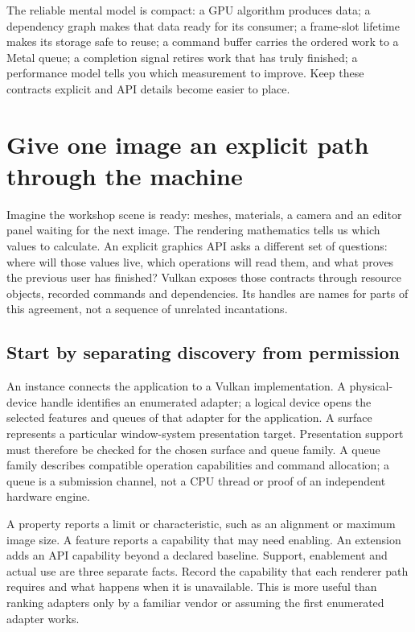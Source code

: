The reliable mental model is compact: a GPU algorithm produces data; a dependency graph makes that data ready for its consumer; a frame-slot lifetime makes its storage safe to reuse; a command buffer carries the ordered work to a Metal queue; a completion signal retires work that has truly finished; a performance model tells you which measurement to improve. Keep these contracts explicit and API details become easier to place.

\section{Give one image an explicit path through the machine}\label{01-foundations-i-ch011-give-one-image-an-explicit-path-through-the-machine}

Imagine the workshop scene is ready: meshes, materials, a camera and an editor panel waiting for the next image. The rendering mathematics tells us which values to calculate. An explicit graphics API asks a different set of questions: where will those values live, which operations will read them, and what proves the previous user has finished? Vulkan exposes those contracts through resource objects, recorded commands and dependencies. Its handles are names for parts of this agreement, not a sequence of unrelated incantations.

\subsection{Start by separating discovery from permission}\label{01-foundations-i-ch011-start-by-separating-discovery-from-permission}

An instance connects the application to a Vulkan implementation. A physical-device handle identifies an enumerated adapter; a logical device opens the selected features and queues of that adapter for the application. A surface represents a particular window-system presentation target. Presentation support must therefore be checked for the chosen surface and queue family. A queue family describes compatible operation capabilities and command allocation; a queue is a submission channel, not a CPU thread or proof of an independent hardware engine.

A property reports a limit or characteristic, such as an alignment or maximum image size. A feature reports a capability that may need enabling. An extension adds an API capability beyond a declared baseline. Support, enablement and actual use are three separate facts. Record the capability that each renderer path requires and what happens when it is unavailable. This is more useful than ranking adapters only by a familiar vendor or assuming the first enumerated adapter works.

